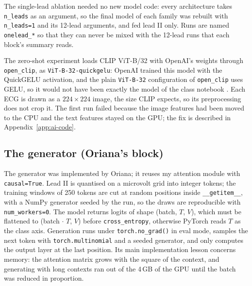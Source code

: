 The single-lead ablation needed no new model code: every architecture takes \texttt{n\_leads} as an
argument, so the final model of each family was rebuilt with \texttt{n\_leads=1} and its 12-lead arguments,
and fed lead II only. Runs are named \texttt{onelead\_*} so that they can never be mixed with the 12-lead
runs that each block's summary reads.

The zero-shot experiment loads CLIP ViT-B/32 with OpenAI's weights through \texttt{open\_clip}, as
\texttt{ViT-B-32-quickgelu}: OpenAI trained this model with the QuickGELU activation, and the plain
\texttt{ViT-B-32} configuration of \texttt{open\_clip} uses GELU, so it would not have been exactly the model
of the class notebook \cite{course_nb_clip}. Each ECG is drawn as a $224 \times 224$ image, the size CLIP
expects, so its preprocessing does not crop it. The first run failed because the image features had been
moved to the CPU and the text features stayed on the GPU; the fix is described in
Appendix~\ref{app:ai-code}.

\subsection{The generator (Oriana's block)}\label{sec:mllb-generator}

The generator was implemented by Oriana; it reuses my attention module with \texttt{causal=True}. Lead II is
quantised on a microvolt grid into integer tokens; the training windows of 250 tokens are cut at random
positions inside \texttt{\_\_getitem\_\_}, with a NumPy generator seeded by the run, so the draws are
reproducible with \texttt{num\_workers=0}. The model returns logits of shape (batch, $T$, $V$), which must
be flattened to (batch $\cdot$ $T$, $V$) before \texttt{cross\_entropy}, otherwise PyTorch reads $T$ as the
class axis. Generation runs under \texttt{torch.no\_grad()} in eval mode, samples the next token with
\texttt{torch.multinomial} and a seeded generator, and only computes the output layer at the last position.
Its main implementation lesson concerns memory: the attention matrix grows with the square of the
context, and generating with long contexts ran out of the 4\,GB of the GPU until the batch was reduced in
proportion.
